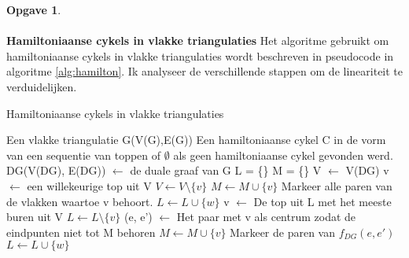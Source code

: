 \documentclass[11pt, a4paper, table]{article}
\makeatletter
\newenvironment{algoritme}[1][H]{%
	\renewcommand{\ALG@name}{Algoritme}%
	\renewcommand{\algorithmicrequire}{\textbf{Input:}}
	\renewcommand{\algorithmicensure}{\textbf{Output:}}
	\begin{algorithm}[#1]%
	}{\end{algorithm}}
\theoremstyle{definition}
\newtheorem{opgave}{Opgave}
\theoremstyle{definition}
\theoremstyle{definition}
\makeatother
\begin{document}
\begin{opgave}
\\\\\textbf{Hamiltoniaanse cykels in vlakke triangulaties}
Het algoritme gebruikt om hamiltoniaanse cykels in vlakke triangulaties wordt beschreven in pseudocode in algoritme \ref{alg:hamilton}. 
Ik analyseer de verschillende stappen om de lineariteit te verduidelijken.
\begin{tcolorbox}[blanker,float=tbp, grow to left by=2cm,grow to right by=2cm]
	\begin{algoritme}
		\caption{Hamiltoniaanse cykels in vlakke  triangulaties}
		\label{alg:hamilton}
		\begin{algorithmic}[1]
			\Require Een vlakke triangulatie G(V(G),E(G))
			\Ensure Een hamiltoniaanse cykel C in de vorm van een sequentie van toppen of $\emptyset$ als geen hamiltoniaanse cykel gevonden werd.
			\State DG(V(DG), E(DG)) $\gets$ de duale graaf van G
			\State L = \{\} \label{alg2:yutsis}
			\State M = \{\}
			\State V $\gets$ V(DG)
			\State v $\gets$ een willekeurige top uit V 
			\State $V \gets V \setminus \{v\}$
			\State $M \gets M \cup \{v\}$
			\State Markeer alle paren van de vlakken waartoe v behoort.\label{alg2:markplanes}
			\label{alg2:addLneighboursloop1}
			\State $L \gets L \cup \{w\}$
			\EndFor
			\label{alg2:startLloop}
			\State v $\gets$ De top uit L met het meeste buren uit V\label{alg2:highestnode}
			\State $L \gets L \setminus \{v\}$\label{alg2:removeLnode}
			 \label{alg2:checkMneighbour}
			\State (e, e') $\gets$ Het paar met v als centrum zodat de eindpunten niet tot M behoren\label{alg2:nonMpair}
			\State $M \gets M \cup \{v\}$
			\State Markeer de paren van $f_{DG}(e,e')$\label{alg2:markplane}
			\label{alg2:addLneighboursloop2}
			\State $L \gets L \cup \{w\}$
			\EndFor
			\EndIf
			\EndIf
			

\end{algorithmic}
\end{algoritme}
\end{tcolorbox}
\end{opgave}
\end{document}
